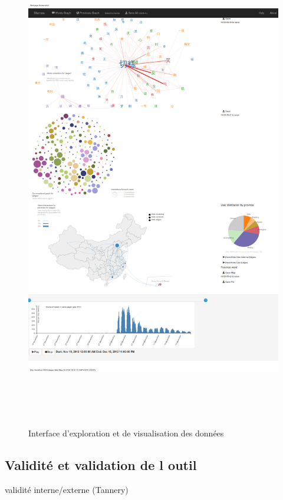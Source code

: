 \begin{figure}
\centering
\includegraphics[width=6.7213in,height=8.3894in]{figures/chap3/chapitre3-img21.png}
\caption{Interface d'exploration et de visualisation des données}
\end{figure}


\subsection[Validité et validation de l outil]{Validité et validation de l outil}

validité interne/externe (Tannery)